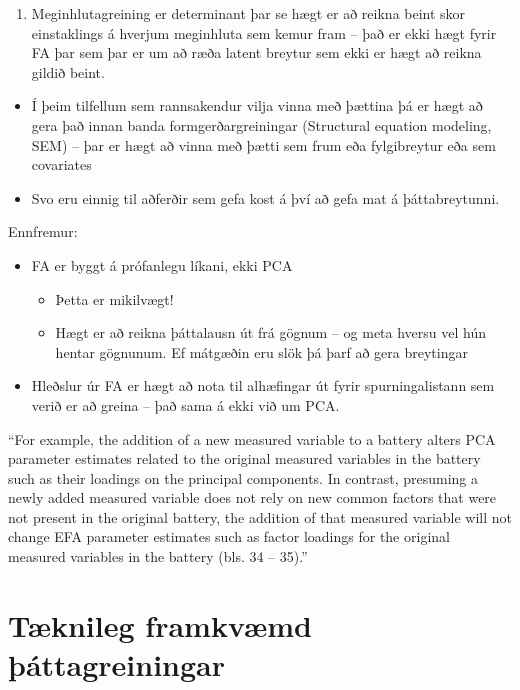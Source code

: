 \documentclass[]{book}
\providecommand{\tightlist}{%
  \setlength{\itemsep}{0pt}\setlength{\parskip}{0pt}}
\begin{document}
\begin{enumerate}
\def\labelenumi{\arabic{enumi})}
\setcounter{enumi}{3}
\tightlist
\item
  Meginhlutagreining er determinant þar se hægt er að reikna beint skor einstaklings á hverjum meginhluta sem kemur fram -- það er ekki hægt fyrir FA þar sem þar er um að ræða latent breytur sem ekki er hægt að reikna gildið beint.
\end{enumerate}

\begin{itemize}
\tightlist
\item
  Í þeim tilfellum sem rannsakendur vilja vinna með þættina þá er hægt að gera það innan banda formgerðargreiningar (Structural equation modeling, SEM) -- þar er hægt að vinna með þætti sem frum eða fylgibreytur eða sem covariates
\item
  Svo eru einnig til aðferðir sem gefa kost á því að gefa mat á þáttabreytunni.
\end{itemize}

Ennfremur:

\begin{itemize}
\tightlist
\item
  FA er byggt á prófanlegu líkani, ekki PCA

  \begin{itemize}
  \tightlist
  \item
    Þetta er mikilvægt!
  \item
    Hægt er að reikna þáttalausn út frá gögnum -- og meta hversu vel hún hentar gögnunum. Ef mátgæðin eru slök þá þarf að gera breytingar
  \end{itemize}
\item
  Hleðslur úr FA er hægt að nota til alhæfingar út fyrir spurningalistann sem verið er að greina -- það sama á ekki við um PCA.
\end{itemize}

``For example, the addition of a new measured variable to a battery alters PCA parameter estimates related to the original measured variables in the battery such as their loadings on the principal components. In contrast, presuming a newly added measured variable does not rely on new common factors that were not present in the original battery, the addition of that measured variable will not change EFA parameter estimates such as factor loadings for the original measured variables in the battery (bls. 34 -- 35).''

\hypertarget{tuxe6knileg-framkvuxe6md-uxfeuxe1ttagreiningar}{%
\section{Tæknileg framkvæmd þáttagreiningar}\label{tuxe6knileg-framkvuxe6md-uxfeuxe1ttagreiningar}}
\end{document}
